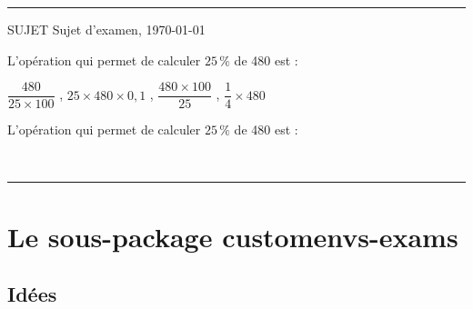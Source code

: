 \documentclass[french,11pt,a4paper]{article}
\begin{document}
\medskip

\hrule

\vfill

\begin{tcolorbox}[colback=lightgray!2,boxrule=0.1mm]
\begin{TitreSujet}{SUJET}
Sujet d'examen, \today
\end{TitreSujet}


\begin{ExamExercice}{1}{4}
\begin{ExamAutomatQuest}{1}
L'opération qui permet de calculer $25\,\%$ de 480 est :

\smallskip

\ExamReponsesQCM%
{%
	{$\dfrac{480}{25 \times 100}$} ,
	{$25 \times 480 \times 0,1$} ,
	{$\dfrac{480 \times 100}{25}$} ,
	{$\dfrac{1}{4} \times 480$}
}
\end{ExamAutomatQuest}

\begin{ExamAutomatQuest}{2}
L'opération qui permet de calculer $25\,\%$ de 480 est :

\smallskip

\end{ExamAutomatQuest}
\end{ExamExercice}
\end{tcolorbox}

\vfill~

\pagebreak


\hypertarget{matoc}{}

\tableofcontents

\vspace*{5mm}

\hrule

\vspace*{5mm}

\section{Le sous-package customenvs-exams}

\subsection{Idées}
\end{document}
